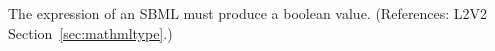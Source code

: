 The  expression of an SBML \Event must produce a
boolean value.  (References: L2V2 Section~\ref{sec:mathmltype}.)
